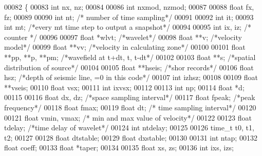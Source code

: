\begin{DoxyCode}
00082 \{
00083     \textcolor{keywordtype}{int} nx, nz;
00084     
00086     \textcolor{keywordtype}{int} nxmod, nzmod; 
00087 
00088     \textcolor{keywordtype}{float} fx, fz;
00089 
00090     \textcolor{keywordtype}{int} nt; \textcolor{comment}{/* number of time sampling*/}
00091 
00092     \textcolor{keywordtype}{int} it;
00093     \textcolor{keywordtype}{int} mt; \textcolor{comment}{/*every mt time step to output a snapshot*/}
00094 
00095     \textcolor{keywordtype}{int} ix, iz;     \textcolor{comment}{/* counter */}
00096 
00097     \textcolor{keywordtype}{float} *wlvt;    \textcolor{comment}{/*wavelet*/}
00098     \textcolor{keywordtype}{float} **v;  \textcolor{comment}{/*velocity model*/}
00099     \textcolor{keywordtype}{float} **vv; \textcolor{comment}{/*velocity in calculating zone*/}
00100 
00101     \textcolor{keywordtype}{float} **pp, **p, **pm;  \textcolor{comment}{/*wavefield at t+dt, t, t-dt*/}
00102 
00103     \textcolor{keywordtype}{float} **s;  \textcolor{comment}{/*spatial distribution of source*/}
00104 
00105     \textcolor{keywordtype}{float} **hseis;  \textcolor{comment}{/*shor records*/}
00106     \textcolor{keywordtype}{float} hsz;  \textcolor{comment}{/*depth of seismic line, =0 in this code*/}
00107     \textcolor{keywordtype}{int} izhsz;
00108 
00109     \textcolor{keywordtype}{float} **vseis;
00110     \textcolor{keywordtype}{float} vsx;
00111     \textcolor{keywordtype}{int} ixvsx;
00112 
00113     \textcolor{keywordtype}{int} np;
00114     \textcolor{keywordtype}{float} *d;
00115 
00116     \textcolor{keywordtype}{float} dx, dz;   \textcolor{comment}{/*space sampling interval*/}
00117     \textcolor{keywordtype}{float} fpeak;    \textcolor{comment}{/*peak frequency*/}
00118     \textcolor{keywordtype}{float} fmax;
00119     \textcolor{keywordtype}{float} dt;   \textcolor{comment}{/* time sampling interval*/}
00120 
00121     \textcolor{keywordtype}{float} vmin, vmax;   \textcolor{comment}{/* min and max value of velocity*/}
00122 
00123     \textcolor{keywordtype}{float} tdelay;   \textcolor{comment}{/*time delay of wavelet*/}
00124     \textcolor{keywordtype}{int} ntdelay;
00125 
00126     time\_t t0, t1, t2;
00127 
00128     \textcolor{keywordtype}{float} dtstable;
00129     \textcolor{keywordtype}{float} dxstable;
00130 
00131     \textcolor{keywordtype}{int} ntap;
00132     \textcolor{keywordtype}{float} coeff;
00133     \textcolor{keywordtype}{float} *taper;
00134 
00135     \textcolor{keywordtype}{float} xs, zs;
00136     \textcolor{keywordtype}{int} ixs, izs;

\end{DoxyCode}
